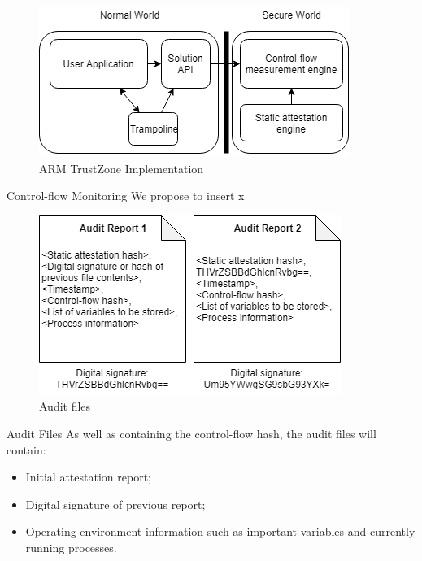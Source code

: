 \documentclass[final]{beamer}
\newlength{\onecolwid}
\newlength{\twocolwid}
\begin{document}
\begin{frame}[t]
\begin{columns}[t]
\begin{column}{\twocolwid}
\begin{columns}[t,totalwidth=\twocolwid]
\begin{column}{\onecolwid}
\begin{figure}
\includegraphics[width=\linewidth]{images/GraphicalRepresentation.png}
\caption{ARM TrustZone Implementation}
\vspace{-1cm}
\end{figure}

\begin{block}{Control-flow Monitoring}
We propose to insert x
\end{block}

\begin{figure}
\includegraphics[width=\linewidth]{images/Files.png}
\caption{Audit files}
\vspace{-1cm}
\end{figure}

\begin{block}{Audit Files}
As well as containing the control-flow hash, the audit files will contain:
\begin{itemize}
	\item Initial attestation report; \vspace*{0.3cm}
	\item Digital signature of previous report; \vspace*{0.3cm}
	\item Operating environment information such as important variables and currently running processes.
\end{itemize}


\end{block}
\end{column}
\end{columns}
\end{column}
\end{columns}
\end{frame}
\end{document}
